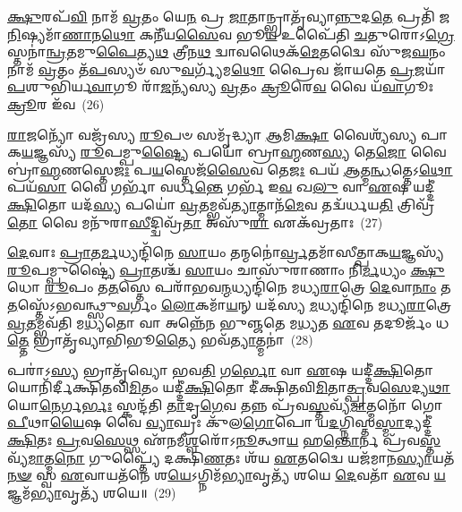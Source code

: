 \-\ul{𑌕𑍍𑌷𑍁}\-𑌰𑌪᳴\-\ul{𑌵𑌿} 𑌨𑌾𑌮᳴ \ul{𑌵𑍍𑌰}\-𑌤𑌂 𑌯𑍇\-\ul{𑌨} 𑌪𑍍𑌰 \ul{𑌜𑌾}\-𑌤𑌾𑌨𑍍𑌭𑍍𑌰𑌾𑌤𑍃᳴𑌵𑍍𑌯𑌾\-\ul{𑌨𑍍𑌨𑍁}\-𑌦\-\ul{𑌤𑍇} 𑌪𑍍𑌰𑌤𑌿᳴ 𑌜\-\ul{𑌨𑌿}\-𑌷𑍍𑌯𑌮𑌾᳴\-\ul{𑌣𑌾}\-𑌨\-\ul{𑌥𑍋} 𑌕𑌨𑍀᳴𑌯\-\ul{𑌸𑍈}\-𑌵 𑌭𑍂\-\ul{𑌯} 𑌉𑌪𑍈᳴𑌤𑌿 \ul{𑌚}\-𑌤𑍁𑌰𑍋\-𑌽\-\ul{𑌗𑍍𑌰𑍇} 𑌸𑍍𑌤𑌨𑌾॑\-\ul{𑌨𑍍𑌵𑍍𑌰}\-𑌤𑌮𑍁\-\ul{𑌪𑍈}\-𑌤𑍍𑌯\-\ul{𑌥} 𑌤𑍍𑌰𑍀𑌨\-\ul{𑌥} 𑌦𑍍𑌵𑌾𑌵𑌥𑍈𑌕᳴\-\ul{𑌮𑍇}\-𑌤𑌦𑍍𑌵𑍈 𑌸𑍁᳴𑌜\-\ul{𑌘}\-𑌨𑌂 𑌨𑌾𑌮᳴ \ul{𑌵𑍍𑌰}\-𑌤𑌂 𑌤᳴\-\ul{𑌪}\-𑌸𑍍𑌯𑍞᳴ 𑌸𑍁\-\ul{𑌵}\-𑌰𑍍𑌗𑍍𑌯᳴𑌮\-\ul{𑌥𑍋} 𑌪𑍍𑌰𑍈𑌵 𑌜𑌾᳴𑌯𑌤𑍇 \ul{𑌪𑍍𑌰}\-𑌜𑌯𑌾᳴ \ul{𑌪}\-𑌶𑍁𑌭𑌿᳴𑌰𑍍𑌯\-\ul{𑌵𑌾}\-𑌗𑍂 𑌰𑌾᳴\-\ul{𑌜}\-𑌨𑍍𑌯᳴𑌸𑍍𑌯 \ul{𑌵𑍍𑌰}\-𑌤𑌂 \ul{𑌕𑍍𑌰𑍂}\-𑌰𑍇\-\ul{𑌵} 𑌵𑍈 𑌯᳴\-\ul{𑌵𑌾}\-𑌗𑍂𑌃 \ul{𑌕𑍍𑌰𑍂}\-𑌰 𑌇᳴𑌵~(26)

\-\ul{𑌰𑌾}\-\-\ul{𑌜}\-𑌨𑍍𑌯𑍋᳴ 𑌵𑌜𑍍𑌰᳴𑌸𑍍𑌯 \ul{𑌰𑍂}\-𑌪𑍞 𑌸𑌮𑍃᳴𑌦𑍍𑌧𑍍𑌯𑌾 \ul{𑌆}\-𑌮𑌿\-\ul{𑌕𑍍𑌷𑌾} 𑌵𑍈𑌶𑍍𑌯᳴𑌸𑍍𑌯 𑌪𑌾𑌕\-\ul{𑌯}\-𑌜𑍍𑌞𑌸𑍍𑌯᳴ \ul{𑌰𑍂}\-𑌪𑌮𑍍𑌪𑍁\-\ul{𑌷𑍍𑌟𑍍𑌯𑍈} 𑌪𑌯𑍋॑ 𑌬𑍍𑌰𑌾\-\ul{𑌹𑍍𑌮}\-𑌣\-\ul{𑌸𑍍𑌯} 𑌤𑍇\-\ul{𑌜𑍋} 𑌵𑍈 𑌬𑍍𑌰𑌾॑\-\ul{𑌹𑍍𑌮}\-𑌣𑌸𑍍𑌤𑍇\-\ul{𑌜𑌃} 𑌪\-\ul{𑌯}\-𑌸𑍍𑌤𑍇𑌜᳴\-\ul{𑌸𑍈}\-𑌵 𑌤𑍇\-\ul{𑌜𑌃} 𑌪𑌯᳴ \ul{𑌆}\-𑌤𑍍𑌮\-\ul{𑌨𑍍𑌧}\-𑌤𑍍𑌤𑍇\-𑌽\-\ul{𑌥𑍋} 𑌪𑌯᳴\-\ul{𑌸𑌾} 𑌵𑍈 𑌗𑌰𑍍𑌭𑌾᳴ 𑌵𑌰𑍍𑌧\-\ul{𑌨𑍍𑌤𑍇} 𑌗𑌰𑍍𑌭᳴ 𑌇\-\ul{𑌵} 𑌖\-\ul{𑌲𑍁} 𑌵𑌾 \ul{𑌏}\-𑌷 𑌯𑌦𑍍𑌦𑍀॑\-\ul{𑌕𑍍𑌷𑌿}\-𑌤𑍋 𑌯𑌦᳴\-\ul{𑌸𑍍𑌯} 𑌪𑌯𑍋॑ \ul{𑌵𑍍𑌰}\-𑌤𑌮𑍍𑌭𑌵᳴\-\ul{𑌤𑍍𑌯𑌾}\-𑌤𑍍𑌮𑌾𑌨᳴\-\ul{𑌮𑍇}\-𑌵 𑌤𑌦𑍍𑌵᳴𑌰𑍍𑌧𑌯\-\ul{𑌤𑌿} 𑌤𑍍𑌰𑌿𑌵𑍍𑌰᳴\-\ul{𑌤𑍋} 𑌵𑍈 𑌮𑌨𑍁᳴𑌰𑌾\-\ul{𑌸𑍀}\-𑌦𑍍𑌦𑍍𑌵𑌿𑌵𑍍𑌰᳴\-\ul{𑌤𑌾} 𑌅𑌸𑍁᳴\-\ul{𑌰𑌾} 𑌏𑌕᳴𑌵𑍍𑌰𑌤𑌾𑌃~(27)

\-\ul{𑌦𑍇}\-𑌵𑌾𑌃 \ul{𑌪𑍍𑌰𑌾}\-𑌤\-\ul{𑌰𑍍𑌮}\-𑌧𑍍𑌯𑌨𑍍𑌦𑌿᳴𑌨𑍇 \ul{𑌸𑌾}\-𑌯𑌂 𑌤𑌨𑍍𑌮𑌨𑍋॑\-\ul{𑌰𑍍𑌵𑍍𑌰}\-𑌤𑌮𑌾᳴𑌸𑍀𑌤𑍍𑌪𑌾𑌕\-\ul{𑌯}\-𑌜𑍍𑌞𑌸𑍍𑌯᳴ \ul{𑌰𑍂}\-𑌪𑌮𑍍𑌪𑍁𑌷𑍍𑌟𑍍𑌯𑍈॑ \ul{𑌪𑍍𑌰𑌾}\-𑌤𑌶𑍍𑌚᳴ \ul{𑌸𑌾}\-𑌯𑌂 𑌚𑌾𑌸𑍁᳴𑌰𑌾𑌣𑌾𑌂 𑌨𑌿\-\ul{𑌰𑍍𑌮}\-𑌧𑍍𑌯𑌂 \ul{𑌕𑍍𑌷𑍁}\-𑌧𑍋 \ul{𑌰𑍂}\-𑌪𑌂 𑌤\-\ul{𑌤}\-𑌸𑍍𑌤𑍇 𑌪𑌰𑌾᳴𑌭𑌵\-\ul{𑌨𑍍𑌮}\-𑌧𑍍𑌯𑌨𑍍𑌦𑌿᳴𑌨𑍇 𑌮𑌧𑍍𑌯\-\ul{𑌰𑌾}\-𑌤𑍍𑌰𑍇 \ul{𑌦𑍇}\-𑌵𑌾\-\ul{𑌨𑌾𑌂} 𑌤\-\ul{𑌤}\-𑌸𑍍𑌤𑍇᳴\-𑌽𑌭𑌵𑌨𑍍𑌥𑍍𑌸𑍁\-\ul{𑌵}\-𑌰𑍍𑌗𑌂 \ul{𑌲𑍋}\-𑌕𑌮𑌾᳴\-\ul{𑌯}\-𑌨𑍍 𑌯𑌦᳴𑌸𑍍𑌯 \ul{𑌮}\-𑌧𑍍𑌯𑌨𑍍𑌦𑌿᳴𑌨𑍇 𑌮𑌧𑍍𑌯\-\ul{𑌰𑌾}\-𑌤𑍍𑌰𑍇 \ul{𑌵𑍍𑌰}\-𑌤𑌮𑍍𑌭𑌵᳴𑌤𑌿 𑌮\-\ul{𑌧𑍍𑌯}\-𑌤𑍋 𑌵𑌾 𑌅𑌨𑍍𑌨𑍇᳴𑌨 𑌭𑍁𑌞𑍍𑌜𑌤𑍇 𑌮\-\ul{𑌧𑍍𑌯}\-𑌤 \ul{𑌏}\-𑌵 𑌤𑌦𑍂𑌰𑍍𑌜𑌂᳴ 𑌧\-\ul{𑌤𑍍𑌤𑍇} 𑌭𑍍𑌰𑌾𑌤𑍃᳴𑌵𑍍𑌯𑌾𑌭𑌿𑌭𑍂\-\ul{𑌤𑍍𑌯𑍈} 𑌭𑌵᳴\-\ul{𑌤𑍍𑌯𑌾}\-𑌤𑍍𑌮𑌨𑌾॑~(28)




𑌪𑌰𑌾॑\-𑌽\-\ul{𑌸𑍍𑌯} 𑌭𑍍𑌰𑌾𑌤𑍃᳴𑌵𑍍𑌯𑍋 𑌭𑌵\-\ul{𑌤𑌿} 𑌗\-\ul{𑌰𑍍𑌭𑍋} 𑌵𑌾 \ul{𑌏}\-𑌷 𑌯𑌦𑍍𑌦𑍀॑\-\ul{𑌕𑍍𑌷𑌿}\-𑌤𑍋 𑌯𑍋𑌨𑌿᳴𑌰𑍍𑌦𑍀𑌕𑍍𑌷𑌿𑌤𑌵𑌿\-\ul{𑌮𑌿}\-𑌤𑌂 𑌯𑌦𑍍𑌦𑍀॑\-\ul{𑌕𑍍𑌷𑌿}\-𑌤𑍋 𑌦𑍀॑𑌕𑍍𑌷𑌿𑌤𑌵𑌿\-\ul{𑌮𑌿}\-𑌤𑌾\-\ul{𑌤𑍍𑌪𑍍𑌰}\-𑌵\-\ul{𑌸𑍇}\-𑌦𑍍𑌯\-\ul{𑌥𑌾} 𑌯𑍋\-\ul{𑌨𑍇}\-𑌰𑍍𑌗\-\ul{𑌰𑍍𑌭𑌃} 𑌸𑍍𑌕𑌨𑍍𑌦᳴𑌤𑌿 \ul{𑌤𑌾}\-𑌦𑍃\-\ul{𑌗𑍇}\-𑌵 𑌤𑌨𑍍𑌨 𑌪𑍍𑌰᳴𑌵\-\ul{𑌸𑍍𑌤}\-𑌵𑍍𑌯᳴\-\ul{𑌮𑌾}\-𑌤𑍍𑌮𑌨𑍋᳴ 𑌗𑍋\-\ul{𑌪𑍀}\-𑌥𑌾\-\ul{𑌯𑍈}\-𑌷 𑌵𑍈 \ul{𑌵𑍍𑌯𑌾}\-𑌘𑍍𑌰𑌃 𑌕𑍁᳴𑌲\-\ul{𑌗𑍋}\-𑌪𑍋 𑌯\-\ul{𑌦}\-𑌗𑍍𑌨𑌿𑌸𑍍𑌤\-\ul{𑌸𑍍𑌮𑌾}\-𑌦𑍍𑌯𑌦𑍍𑌦𑍀॑\-\ul{𑌕𑍍𑌷𑌿}\-𑌤𑌃 \ul{𑌪𑍍𑌰}\-𑌵\-\ul{𑌸𑍇}\-𑌥𑍍𑌸 𑌏᳴𑌨𑌮𑍀\-\ul{𑌶𑍍𑌵}\-𑌰𑍋᳴\-𑌽\-\ul{𑌨𑍂}\-𑌤𑍍𑌥𑌾\-\ul{𑌯} 𑌹\-\ul{𑌨𑍍𑌤𑍋}\-𑌰𑍍𑌨 𑌪𑍍𑌰᳴𑌵\-\ul{𑌸𑍍𑌤}\-𑌵𑍍𑌯᳴\-\ul{𑌮𑌾}\-𑌤𑍍𑌮\-\ul{𑌨𑍋} 𑌗𑍁𑌪𑍍𑌤𑍍𑌯𑍈᳴ 𑌦𑌕𑍍𑌷𑌿\-\ul{𑌣}\-𑌤𑌃 𑌶᳴𑌯 \ul{𑌏}\-𑌤𑌦𑍍𑌵𑍈 𑌯𑌜᳴𑌮𑌾𑌨\-\ul{𑌸𑍍𑌯𑌾}\-𑌯𑌤᳴\-\ul{𑌨}\-\-\ul{𑍟} 𑌸𑍍𑌵 \ul{𑌏}\-𑌵𑌾𑌯𑌤᳴𑌨𑍇 𑌶\-\ul{𑌯𑍇}\-\-𑌽𑌗𑍍𑌨𑌿𑌮᳴\-\ul{𑌭𑍍𑌯𑌾}\-𑌵𑍃𑌤𑍍𑌯᳴ 𑌶𑌯𑍇 \ul{𑌦𑍇}\-𑌵𑌤𑌾᳴ \ul{𑌏}\-𑌵 \ul{𑌯}\-𑌜𑍍𑌞𑌮᳴\-\ul{𑌭𑍍𑌯𑌾}\-𑌵𑍃𑌤𑍍𑌯᳴ 𑌶𑌯𑍇॥~(29)

